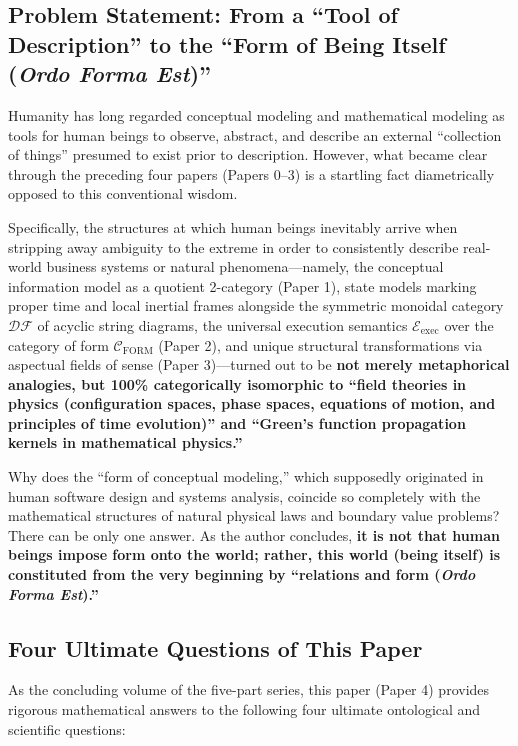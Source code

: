 \documentclass[11pt,a4paper]{article}
\theoremstyle{definition}
\theoremstyle{plain}
\begin{document}
\subsection{Problem Statement: From a ``Tool of Description'' to the ``Form of Being Itself (\textit{Ordo Forma Est})''}
Humanity has long regarded conceptual modeling and mathematical modeling as tools for human beings to observe, abstract, and describe an external ``collection of things'' presumed to exist prior to description. However, what became clear through the preceding four papers (Papers 0--3) is a startling fact diametrically opposed to this conventional wisdom.

Specifically, the structures at which human beings inevitably arrive when stripping away ambiguity to the extreme in order to consistently describe real-world business systems or natural phenomena---namely, the conceptual information model as a quotient 2-category (Paper 1), state models marking proper time and local inertial frames alongside the symmetric monoidal category $\mathcal{DF}$ of acyclic string diagrams, the universal execution semantics $\mathcal{E}_{\mathrm{exec}}$ over the category of form $\mathcal{C}_{\mathrm{FORM}}$ (Paper 2), and unique structural transformations via aspectual fields of sense (Paper 3)---turned out to be \textbf{not merely metaphorical analogies, but 100\% categorically isomorphic to ``field theories in physics (configuration spaces, phase spaces, equations of motion, and principles of time evolution)'' and ``Green's function propagation kernels in mathematical physics.''}

Why does the ``form of conceptual modeling,'' which supposedly originated in human software design and systems analysis, coincide so completely with the mathematical structures of natural physical laws and boundary value problems? There can be only one answer. As the author concludes, \textbf{it is not that human beings impose form onto the world; rather, this world (being itself) is constituted from the very beginning by ``relations and form (\textit{Ordo Forma Est}).''}

\subsection{Four Ultimate Questions of This Paper}
As the concluding volume of the five-part series, this paper (Paper 4) provides rigorous mathematical answers to the following four ultimate ontological and scientific questions:
\end{document}

